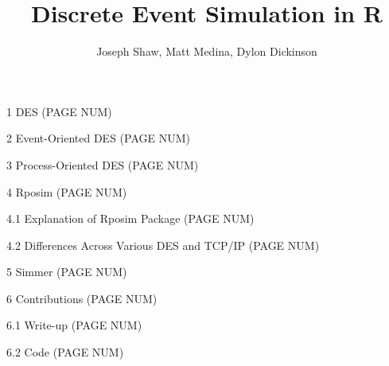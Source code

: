 \documentclass[titlepage]{article}
\author{\Large \newline Joseph Shaw, Matt Medina, Dylon Dickinson}
\title{\Huge Discrete Event Simulation in R}
\begin{document}
	\maketitle
	
\clearpage

\vspace{-1in}


\tableofcontents

\Large

\vfill

1 \hspace{0.1in} DES \hfill (PAGE NUM)

\vfill

2 \hspace{0.1in} Event-Oriented DES \hfill (PAGE NUM)

\vfill

3 \hspace{0.1in} Process-Oriented DES \hfill (PAGE NUM)

\vfill

4 \hspace{0.1in} Rposim \hfill (PAGE NUM)

\vfill

\hspace{0.25in} 4.1 \hspace{0.1in} Explanation of Rposim Package \hfill (PAGE NUM)

\vfill

\hspace{0.25in} 4.2 \hspace{0.1in} Differences Across Various DES and TCP/IP \hfill (PAGE NUM)

\vfill

5 \hspace{0.1in} Simmer \hfill (PAGE NUM)

\vfill

6 \hspace{0.1in} Contributions \hfill (PAGE NUM)

\vfill

\hspace{0.25in} 6.1 \hspace{0.1in} Write-up \hfill (PAGE NUM)

\vfill

\hspace{0.25in} 6.2 \hspace{0.1in} Code \hfill (PAGE NUM)
\end{document}
